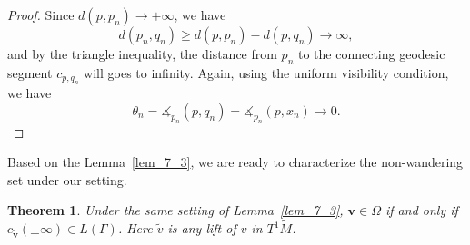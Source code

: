 \documentclass[reqno,11pt]{article}
\newtheorem{theorem}{Theorem}[section]
\theoremstyle{definition}
\theoremstyle{remark}
\numberwithin{equation}{section}
\begin{document}
\begin{proof}
	Since $d(p,p_n)\to +\infty$, we have
	\begin{displaymath}
		d(p_n,q_n)\geq d(p,p_n)-d(p,q_n)\to\infty,
	\end{displaymath}
	and by the triangle inequality, the distance from $p_n$ to the connecting geodesic segment $c_{p,q_n}$ will goes to infinity. Again, using the uniform visibility condition, we have
	\begin{displaymath}
		\theta_n=\measuredangle_{p_n}(p,q_n)=\measuredangle_{p_n}(p,x_n)\to 0.
	\end{displaymath}
\end{proof}

Based on the Lemma~\ref{lem_7_3}, we are ready to characterize the non-wandering set under our setting.

\begin{theorem}\label{thm_7_4}
	Under the same setting of Lemma~\ref{lem_7_3}, $\bm{v}\in\Omega$ if and only if $c_{\bm{\widetilde{v}}}(\pm\infty)\in L(\Gamma)$. Here $\widetilde{v}$ is any lift of $v$ in $T^1\widetilde{M}$.
\end{theorem}
\end{document}
